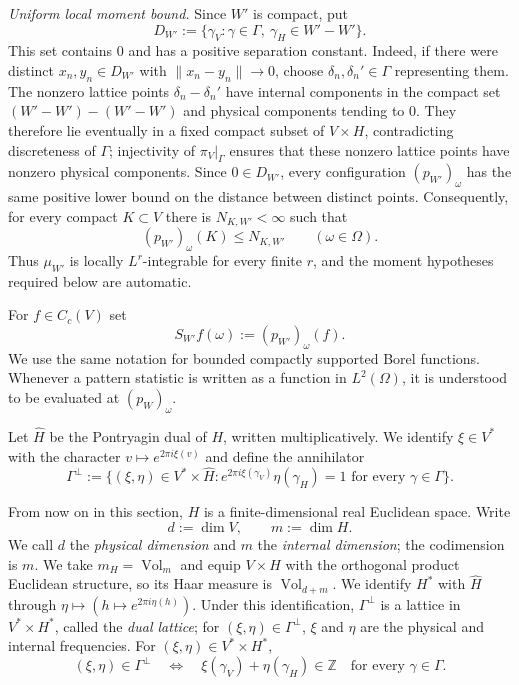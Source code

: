 \documentclass[11pt,reqno,a4paper]{amsart}
\numberwithin{equation}{section}
\theoremstyle{compact}
\theoremstyle{definition}
\theoremstyle{definition}
\newcommand{\Vol}{\operatorname{Vol}}
\begin{document}
\smallskip\noindent\emph{Uniform local moment bound.}
Since $W'$ is compact, put
\[
  D_{W'}:=\{\gamma_V:\gamma\in\Gamma,\ \gamma_H\in W'-W'\}.
\]
This set contains $0$ and has a positive separation constant.  Indeed, if
there were distinct $x_n,y_n\in D_{W'}$ with $\|x_n-y_n\|\to0$, choose
$\delta_n,\delta_n'\in\Gamma$ representing them.  The nonzero lattice points
$\delta_n-\delta_n'$ have internal components in the compact set
$(W'-W')-(W'-W')$ and physical components tending to $0$.  They therefore
lie eventually in a fixed compact subset of $V\times H$, contradicting
discreteness of $\Gamma$; injectivity of $\pi_V|_\Gamma$ ensures that these
nonzero lattice points have nonzero physical components.  Since $0\in D_{W'}$,
every configuration $(p_{W'})_\omega$ has the same positive lower bound on
the distance between distinct points.  Consequently, for every compact
$K\subset V$ there is $N_{K,W'}<\infty$ such that
\[
  (p_{W'})_\omega(K)\leq N_{K,W'}
  \qquad(\omega\in\Omega).
\]
Thus $\mu_{W'}$ is locally $L^r$-integrable for every finite $r$, and the
moment hypotheses required below are automatic.

For $f\in C_c(V)$ set
\begin{equation}\label{eq:cap-window-statistic}
  S_{W'}f(\omega):=(p_{W'})_\omega(f).
\end{equation}
We use the same notation for bounded compactly supported Borel functions.
Whenever a pattern statistic is written as a function in $L^2(\Omega)$, it is
understood to be evaluated at $(p_W)_\omega$.

Let $\widehat H$ be the Pontryagin dual of $H$, written multiplicatively.  We
identify $\xi\in V^*$ with the character $v\mapsto e^{2\pi i\xi(v)}$ and
define the annihilator
\begin{equation}\label{eq:cap-dual-lattice-definition}
  \Gamma^\perp
  :=\bigl\{(\xi,\eta)\in V^*\times\widehat H:
      e^{2\pi i\xi(\gamma_V)}\eta(\gamma_H)=1
      \text{ for every }\gamma\in\Gamma\bigr\}.
\end{equation}

From now on in this section, $H$ is a finite-dimensional real Euclidean
space.  Write
\[
  d:=\dim V,\qquad m:=\dim H.
\]
We call $d$ the \emph{physical dimension} and $m$ the \emph{internal
dimension}; the codimension is $m$.  We take $m_H=\Vol_m$ and equip
$V\times H$ with the orthogonal product Euclidean structure, so its Haar
measure is $\Vol_{d+m}$.  We identify $H^*$ with $\widehat H$ through
$\eta\mapsto(h\mapsto e^{2\pi i\eta(h)})$.  Under this identification,
$\Gamma^\perp$ is a lattice in $V^*\times H^*$, called the \emph{dual
lattice}; for $(\xi,\eta)\in\Gamma^\perp$, $\xi$ and $\eta$ are the physical
and internal frequencies.  For $(\xi,\eta)\in V^*\times H^*$,
\begin{equation}\label{eq:cap-dual-membership-additive}
  (\xi,\eta)\in\Gamma^\perp
  \quad\Longleftrightarrow\quad
  \xi(\gamma_V)+\eta(\gamma_H)\in\mathbb Z
  \quad\text{for every }\gamma\in\Gamma.
\end{equation}
\end{document}

